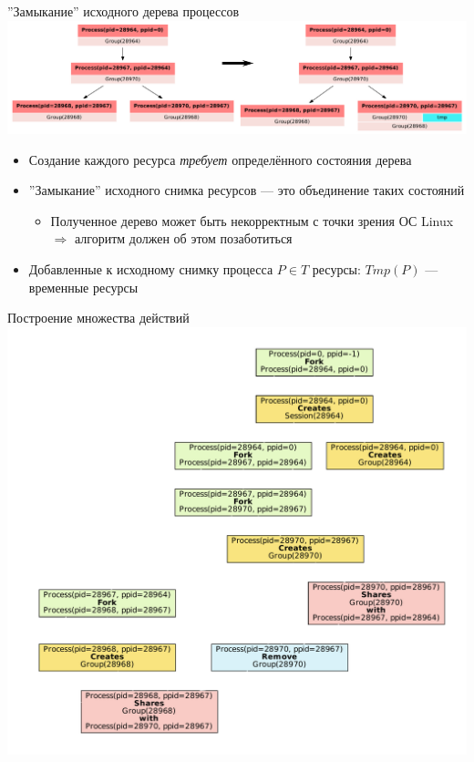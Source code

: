 \begin{frame}{''Замыкание'' исходного дерева процессов}
\includegraphics[width=\textwidth]{fig/pstreeClosure.pdf}

\begin{itemize}
	\item Создание каждого ресурса \emph{требует} \alert{определённого состояния} дерева
	\item ''Замыкание'' исходного снимка ресурсов --- это объединение таких состояний
	\begin{itemize}
		\item Полученное дерево может быть некорректным с точки зрения ОС Linux $\Rightarrow$ алгоритм должен об этом позаботиться
	\end{itemize}
	\item Добавленные к исходному снимку процесса $P \in T$ ресурсы: $Tmp(P)$ --- временные ресурсы 

\end{itemize}
\end{frame}


\begin{frame}{Построение множества действий}
\centering
\includegraphics[scale=0.3]{fig/simpleGroupsGraph.pdf}
\end{frame}


